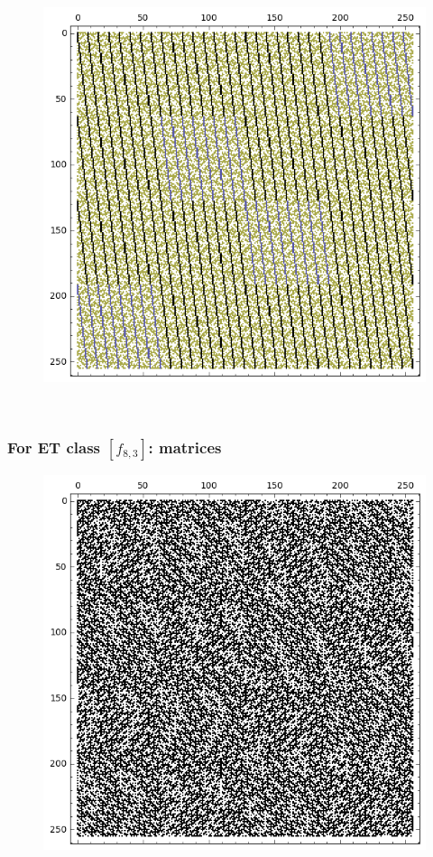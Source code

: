 \documentclass[pdf,sprung,slideColor,nocolorBG]{beamer}
\newenvironment{colortheme}[1]{
\def\ProvidesPackageRCS $##1${\relax}
\renewcommand{\ProcessOptions}{\relax}
\makeatletter

\makeatother
}{}
\begin{document}
\begin{colortheme}{jubata}
\begin{frame}
\begin{figure}
\begin{minipage}{.48\textwidth}
  \label{fig:8_2_weight_class_matrix}
\end{minipage}%
\begin{minipage}{.48\textwidth}
  \centering
  \includegraphics[width=.9\linewidth]{../matrix_plot/re8_2_bent_cayley_graph_index_matrix.png}
  \label{fig:8_2_bent_cayley_graph_index_matrix}
\end{minipage}
\end{figure}
~
\end{frame}
\begin{frame}
\frametitle{For ET class $[f_{8,3}]$: matrices}
\begin{figure}
\centering
\begin{minipage}{.48\textwidth}
  \centering
  \includegraphics[width=.9\linewidth]{../matrix_plot/re8_3_weight_class_matrix.png}

\end{minipage}
\end{figure}
\end{frame}
\end{colortheme}
\end{document}
